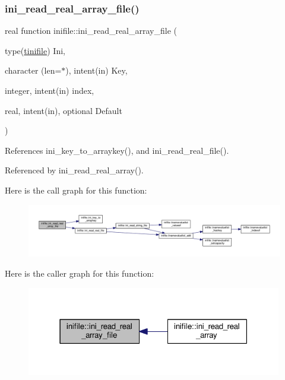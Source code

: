 \subsubsection{\texorpdfstring{ini\+\_\+read\+\_\+real\+\_\+array\+\_\+file()}{ini\_read\_real\_array\_file()}}
{\footnotesize\ttfamily real function inifile\+::ini\+\_\+read\+\_\+real\+\_\+array\+\_\+file (\begin{DoxyParamCaption}\item[{type(\mbox{\hyperlink{structinifile_1_1tinifile}{tinifile}})}]{Ini,  }\item[{character (len=$\ast$), intent(in)}]{Key,  }\item[{integer, intent(in)}]{index,  }\item[{real, intent(in), optional}]{Default }\end{DoxyParamCaption})}



References ini\+\_\+key\+\_\+to\+\_\+arraykey(), and ini\+\_\+read\+\_\+real\+\_\+file().



Referenced by ini\+\_\+read\+\_\+real\+\_\+array().

Here is the call graph for this function\+:
\nopagebreak
\begin{figure}[H]
\begin{center}
\leavevmode
\includegraphics[width=350pt]{namespaceinifile_aec5d85c08e9381bc15b4dd5f9250a228_cgraph}
\end{center}
\end{figure}
Here is the caller graph for this function\+:
\nopagebreak
\begin{figure}[H]
\begin{center}
\leavevmode
\includegraphics[width=316pt]{namespaceinifile_aec5d85c08e9381bc15b4dd5f9250a228_icgraph}
\end{center}
\end{figure}
\mbox{\label{namespaceinifile_a307d88edca7f1673a935f6c87c304019}} 
